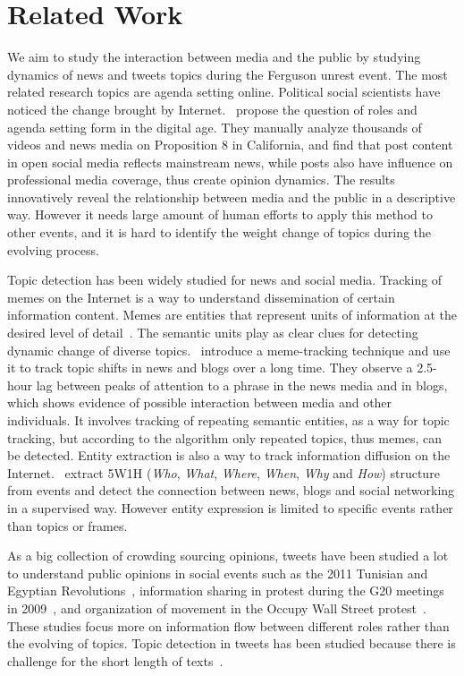 \section{Related Work}
\label{sec:related_work}

We aim to study the interaction between media and the public by studying dynamics of news and tweets topics during the Ferguson unrest event. The most related research topics are agenda setting online. Political social scientists have noticed the change brought by Internet.~ propose the question of roles and agenda setting form in the digital age. They manually analyze thousands of videos and news media on Proposition 8 in California, and find that post content in open social media reflects mainstream news, while posts also have influence on professional media coverage, thus create opinion dynamics. The results innovatively reveal the relationship between media and the public in a descriptive way. However it needs large amount of human efforts to apply this method to other events, and it is hard to identify the weight change of topics during the evolving process.

Topic detection has been widely studied for news and social media. Tracking of memes on the Internet is a way to understand dissemination of certain information content. Memes are entities that represent units of information at the desired level of detail~\cite{ratkiewicz2010detecting}. The semantic units play as clear clues for detecting dynamic change of diverse topics.~ introduce a meme-tracking technique and use it to track topic shifts in news and blogs over a long time. They observe a 2.5-hour lag between peaks of attention to a phrase in the news media and in blogs, which shows evidence of possible interaction between media and other individuals. It involves tracking of repeating semantic entities, as a way for topic tracking, but according to the algorithm only repeated topics, thus memes, can be detected. Entity extraction is also a way to track information diffusion on the Internet.~ extract 5W1H (\emph{Who}, \emph{What}, \emph{Where}, \emph{When}, \emph{Why} and \emph{How}) structure from events and detect the connection between news, blogs and social networking in a supervised way. However entity expression is limited to specific events rather than topics or frames.

As a big collection of crowding sourcing opinions, tweets have been studied a lot to understand public opinions in social events such as the 2011 Tunisian and Egyptian Revolutions~\cite{gonzalez2011dynamics}, information sharing in protest during the G20 meetings in 2009~\cite{earl2013protest}, and organization of movement in the Occupy Wall Street protest~\cite{conover2013geospatial}. These studies focus more on information flow between different roles rather than the evolving of topics. Topic detection in tweets has been studied because there is challenge for the short length of texts~\cite{yan2013biterm,zhao2011comparing}.

